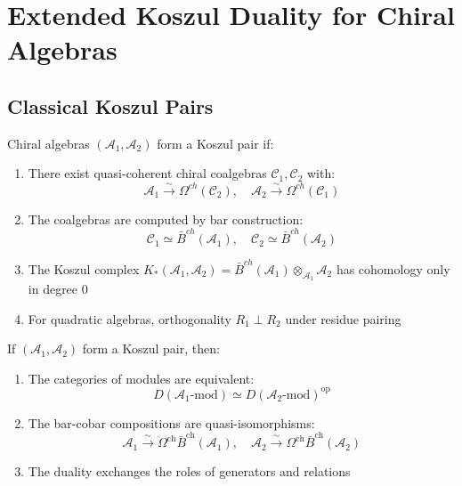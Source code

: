 \section{Extended Koszul Duality for Chiral Algebras}
 
\subsection{Classical Koszul Pairs}

\begin{definition}
Chiral algebras $(\mathcal{A}_1, \mathcal{A}_2)$ form a Koszul pair if:
\begin{enumerate}
\item There exist quasi-coherent chiral coalgebras $\mathcal{C}_1, \mathcal{C}_2$ with:
   $$\mathcal{A}_1 \xrightarrow{\sim} \Omega^{ch}(\mathcal{C}_2), \quad \mathcal{A}_2 \xrightarrow{\sim} \Omega^{ch}(\mathcal{C}_1)$$
\item The coalgebras are computed by bar construction:
   $$\mathcal{C}_1 \simeq \bar{B}^{ch}(\mathcal{A}_1), \quad \mathcal{C}_2 \simeq \bar{B}^{ch}(\mathcal{A}_2)$$
\item The Koszul complex $K_*(\mathcal{A}_1, \mathcal{A}_2) = \bar{B}^{ch}(\mathcal{A}_1) \otimes_{\mathcal{A}_1} \mathcal{A}_2$
   has cohomology only in degree 0
\item For quadratic algebras, orthogonality $R_1 \perp R_2$ under residue pairing
\end{enumerate}
\end{definition}
 
\begin{theorem}\label{thm:koszul-main}
If $(\mathcal{A}_1, \mathcal{A}_2)$ form a Koszul pair, then:
\begin{enumerate}
\item The categories of modules are equivalent:
\[
D(\mathcal{A}_1\text{-mod}) \simeq D(\mathcal{A}_2\text{-mod})^{\text{op}}
\]
\item The bar-cobar compositions are quasi-isomorphisms:
\[
\mathcal{A}_1 \xrightarrow{\sim} \Omega^{\text{ch}}\bar{B}^{\text{ch}}(\mathcal{A}_1), \quad
\mathcal{A}_2 \xrightarrow{\sim} \Omega^{\text{ch}}\bar{B}^{\text{ch}}(\mathcal{A}_2)
\]
\item The duality exchanges the roles of generators and relations
\end{enumerate}
\end{theorem}
 
